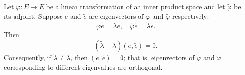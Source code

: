 Let $\varphi: E \rightarrow E$ be a linear transformation of an inner product space and let $\tilde{\varphi}$ be its adjoint. Suppose $e$ and $\tilde{e}$ are eigenvectors of $\varphi$ and $\tilde{\varphi}$ respectively:
$$\varphi e = \lambda e, \quad \tilde{\varphi} \tilde{e} = \tilde{\lambda} \tilde{e}.$$
Then
$$(\tilde{\lambda} - \lambda)(e, \tilde{e}) = 0.$$
Consequently, if $\tilde{\lambda} \neq \lambda$, then $(e, \tilde{e}) = 0$; that is, eigenvectors of $\varphi$ and $\tilde{\varphi}$ corresponding to different eigenvalues are orthogonal.
